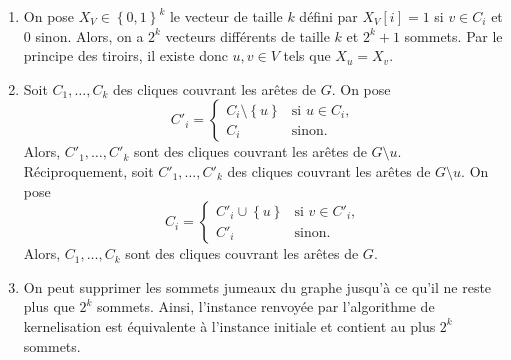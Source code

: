 \begin{td-sol}
    \begin{enumerate}
        \item On pose \(X_V \in {\left\{0, 1\right\}}^k\) le vecteur de taille \(k\) défini par \(X_V[i] = 1\) si \(v \in C_i\) et \(0\) sinon.
        Alors, on a \(2^k\) vecteurs différents de taille \(k\) et \(2^k + 1\) sommets.
        Par le principe des tiroirs, il existe donc \(u, v \in V\) tels que \(X_u = X_v\).

        \item Soit \(C_1,\ldots,C_k\) des cliques couvrant les arêtes de \(G\).
        On pose
        \begin{equation*}
            C'_i = \begin{cases}
                C_i \setminus \left\{ u \right\} & \text{si } u \in C_i,\\
                C_i & \text{sinon.}
            \end{cases}
        \end{equation*}
        Alors, \(C'_1,\ldots,C'_k\) sont des cliques couvrant les arêtes de \(G \setminus u\).
        Réciproquement, soit \(C'_1,\ldots,C'_k\) des cliques couvrant les arêtes de \(G \setminus u\).
        On pose
        \begin{equation*}
            C_i = \begin{cases}
                C'_i \cup \left\{ u \right\} & \text{si } v \in C'_i,\\
                C'_i & \text{sinon.}
            \end{cases}
        \end{equation*}
        Alors, \(C_1,\ldots,C_k\) sont des cliques couvrant les arêtes de \(G\).
    
        \item On peut supprimer les sommets jumeaux du graphe jusqu'à ce qu'il ne reste plus que \(2^k\) sommets.
        Ainsi, l'instance renvoyée par l'algorithme de kernelisation est équivalente à l'instance initiale et contient au plus \(2^k\) sommets.
    \end{enumerate}
\end{td-sol}

